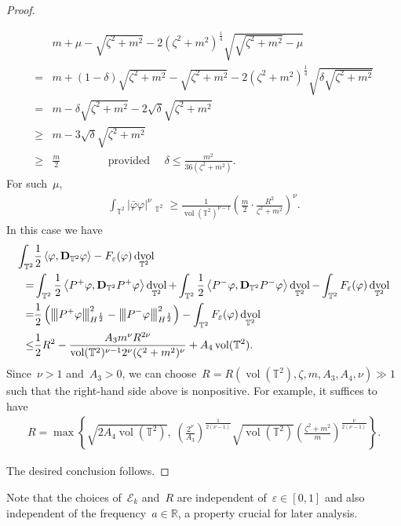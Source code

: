 \documentclass[10pt,a4paper]{amsart}
\newcommand{\tnorm}[1]{%
  \left\vert\kern-0.3ex\left\vert\kern-0.3ex\left\vert #1 \right\vert\kern-0.3ex\right\vert\kern-0.3ex\right\vert
}
\newcommand{\R}{\mathbb{R}}
\newcommand{\T}{\mathbb{T}}
\newcommand{\dd}{\mathop{}\!\mathrm{d}}
\newcommand{\eps}{\varepsilon}
\newcommand{\pD}{\mathbf{D}}
\newcommand{\Abracket}[1]{\left<#1\right>} %
\newcommand{\parenthesis}[1]{\left(#1\right)} %
\newcommand{\braces}[1]{\left\{#1\right\}} %
\DeclareMathOperator{\dv}{\dd{vol}}
\DeclareMathOperator{\vol}{vol}
\begin{document}
\begin{proof}
\begin{itemize}
\begin{align}
   &m+\mu-\sqrt{\zeta^2+m^2} -2(\zeta^2+m^2)^{\frac{1}{4}}\sqrt{\sqrt{ \zeta^2+m^2 }  -\mu}  \\
   =& m+(1-\delta)\sqrt{\zeta^2+m^2}-\sqrt{\zeta^2+m^2} -2(\zeta^2+m^2)^{\frac{1}{4}}\sqrt{\delta\sqrt{\zeta^2+m^2}}\\
   =& m -\delta\sqrt{ \zeta^2+m^2 }-2\sqrt{\delta}\sqrt{ \zeta^2+m^2 }\\
   \geq& m-3\sqrt{\delta}\sqrt{ \zeta^2+m^2 }\\
   \geq& \frac{m}{2} \qquad\qquad \mbox{ provided }\quad \delta\leq\frac{m^2}{36(\zeta^2+m^2)}.
\end{align}
For such~$\mu$, 
\begin{align}
    \int_{\T^2} |\bar{\varphi}\varphi|^\nu \dv_{\T^2}
    \geq  \frac{1}{\vol(\T^2)^{\nu -1}} \parenthesis{\frac{m}{2}\cdot\frac{R^2}{\zeta^2+m^2}}^{\nu}.
\end{align}
In this case we have
\begin{align}
    \int_{\T^2} & \frac{1}{2}\Abracket{\varphi,\pD_{\T^2} \varphi}- F_\eps(\varphi) \dv_{\T^2} \\
    =& \int_{\T^2} \frac{1}{2}\Abracket{P^+\varphi,\pD_{\T^2} P^+\varphi} \dv_{\T^2} + \int_{\T^2}\frac{1}{2}\Abracket{P^-\varphi,\pD_{\T^2}P^-\varphi} \dv_{\T^2} - \int_{\T^2} F_\eps(\varphi)\dv_{\T^2} \\
    =&\frac{1}{2}\parenthesis{ \tnorm{P^+\varphi }_{H^{\frac{1}{2}}}^2 - \tnorm{P^-\varphi}_{H^{\frac{1}{2}}}^2  }
     -\int_{\T^2} F_\eps(\varphi)\dv_{\T^2}\\
    \leq & \frac{1}{2}R^2
    - \frac{A_3m^\nu R^{2\nu}}{\vol(\T^2)^{\nu-1} 2^\nu({\zeta^2+m^2})^\nu}
     +  A_4 \vol(\T^2).
\end{align}
Since~$\nu>1$ and~$A_3>0$, we can choose~$R=R(\vol(\T^2), \zeta,m, A_3, A_4, \nu)\gg 1$ such that the right-hand side above is nonpositive.
For example, it suffices to have 
\begin{align}
    R=\max\braces{\sqrt{2A_4 \vol(\T^2)} , \; \parenthesis{\frac{2^\nu}{A_3}}^{\frac{1}{2(\nu-1)}} \sqrt{\vol(\T^2)} \parenthesis{\frac{\zeta^2+m^2}{m}}^{\frac{\nu}{2(\nu-1)}} }. 
\end{align}
\end{itemize}
The desired conclusion follows.
\end{proof}
Note that the choices of~$\mathscr{E}_k$ and~$R$ are independent of~$\eps\in [0,1]$ and also independent of the frequency~$a\in \R$, a property crucial for later analysis.
\end{document}
